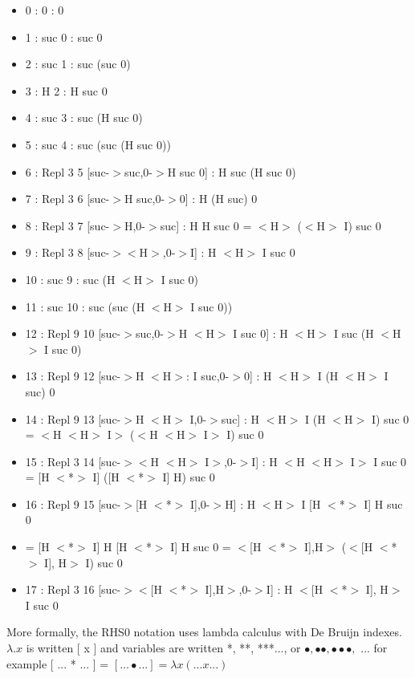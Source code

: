 \documentclass[10pt]{article}
\begin{document}
\begin{itemize}
     \setlength{\itemsep}{1pt}
     \setlength{\parskip}{0pt}
     \setlength{\parsep}{0pt}

\item    0 : 0 : 0
\item    1 : suc 0 : suc 0
\item    2 : suc 1 : suc (suc 0)
\item    3 : H 2 : H suc 0
\item    4 : suc 3 : suc (H suc 0)
\item    5 : suc 4 : suc (suc (H suc 0))
\item    6 : Repl 3 5 [suc-$>$suc,0-$>$H suc 0] : H suc (H suc 0)
\item    7 : Repl 3 6 [suc-$>$H suc,0-$>$0] : H (H suc) 0
\item    8 : Repl 3 7 [suc-$>$H,0-$>$suc] : H H suc 0 = $<$H$>$ ($<$H$>$ I) suc 0
\item    9 : Repl 3 8 [suc-$>$$<$H$>$,0-$>$I] : H $<$H$>$ I suc 0
\item    10 : suc 9 : suc (H $<$H$>$ I suc 0)
\item    11 : suc 10 : suc (suc (H $<$H$>$ I suc 0))
\item    12 : Repl 9 10 [suc-$>$suc,0-$>$H $<$H$>$ I suc 0] : H $<$H$>$ I suc (H $<$H$>$ I suc 0)
\item    13 : Repl 9 12 [suc-$>$H $<$H$>$: I suc,0-$>$0] : H $<$H$>$ I (H $<$H$>$ I suc) 0
\item    14 : Repl 9 13 [suc-$>$H $<$H$>$ I,0-$>$suc] : H $<$H$>$ I (H $<$H$>$ I) suc 0 = $<$H $<$H$>$ I$>$ ($<$H $<$H$>$ I$>$ I) suc 0
\item    15 : Repl 3 14 [suc-$>$$<$H $<$H$>$ I$>$,0-$>$I] : H $<$H $<$H$>$ I$>$ I suc 0 = [H $<$*$>$ I] ([H $<$*$>$ I] H) suc 0
\item    16 : Repl 9 15 [suc-$>$[H $<$*$>$ I],0-$>$H] : H $<$H$>$ I [H $<$*$>$ I] H suc 0 
\item     = [H $<$*$>$ I] H [H $<$*$>$ I] H suc 0 = $<$[H $<$*$>$ I],H$>$ ($<$[H $<$*$>$ I], H$>$ I) suc 0
\item    17 : Repl 3 16 [suc-$>$$<$[H $<$*$>$ I],H$>$,0-$>$I] : H $<$[H $<$*$>$ I], H$>$ I suc 0 

\end{itemize}

More formally, the RHS0 notation uses lambda calculus with De Bruijn indexes.
\( \lambda.x \) is written [ x ] and variables are written *, **, ***..., or \( \bullet, \bullet \bullet, \bullet \bullet \bullet, \) ...
for example [ ... * ... ] = \( [ ... \bullet ... ] = \lambda x ( ... x ... ) \)
\end{document}
